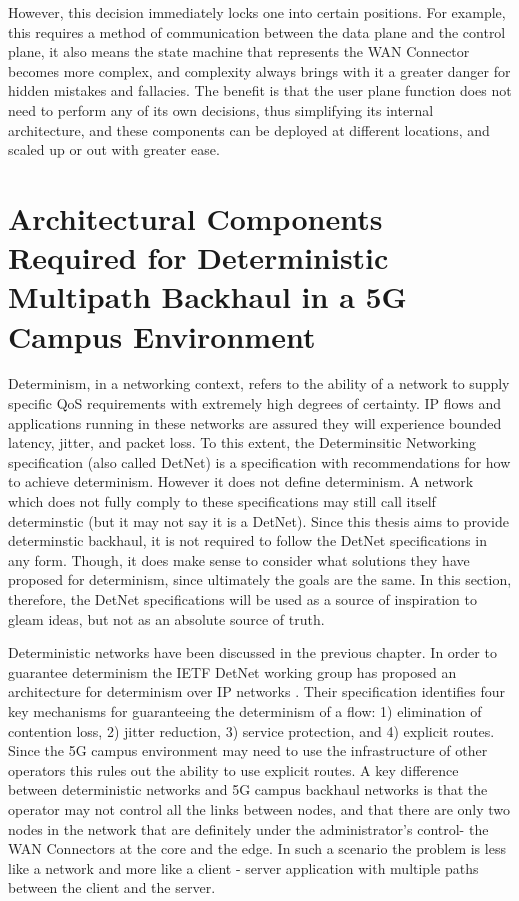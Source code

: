However, this decision immediately locks one into certain positions. For example, this requires a method of communication between the data plane and the control plane, it also means the state machine that represents the WAN Connector becomes more complex, and complexity always brings with it a greater danger for hidden mistakes and fallacies. The benefit is that the user plane function does not need to perform any of its own decisions, thus simplifying its internal architecture, and these components can be deployed at different locations, and scaled up or out with greater ease.

\section{Architectural Components Required for Deterministic Multipath Backhaul in a 5G Campus Environment}
\label{sec:approach:req}

Determinism, in a networking context, refers to the ability of a network to supply specific QoS requirements with extremely high degrees of certainty. IP flows and applications running in these networks are assured they will experience bounded latency, jitter, and packet loss. To this extent, the Determinsitic Networking specification (also called DetNet) is a specification with recommendations for how to achieve determinism. However it does not define determinism. A network which does not fully comply to these specifications may still call itself determinstic (but it may not say it is a DetNet). Since this thesis aims to provide determinstic backhaul, it is not required to follow the DetNet specifications in any form. Though, it does make sense to consider what solutions they have proposed for determinism, since ultimately the goals are the same. In this section, therefore, the DetNet specifications will be used as a source of inspiration to gleam ideas, but not as an absolute source of truth.

Deterministic networks have been discussed in the previous chapter. In order to guarantee determinism the IETF DetNet working group has proposed an architecture for determinism over IP networks \cite{finn2019deterministicArch}. Their specification identifies four key mechanisms for guaranteeing the determinism of a flow: 1) elimination of contention loss, 2) jitter reduction, 3) service protection, and 4) explicit routes. Since the 5G campus environment may need to use the infrastructure of other operators this rules out the ability to use explicit routes. A key difference between deterministic networks and 5G campus backhaul networks is that the operator may not control all the links between nodes, and that there are only two nodes in the network that are definitely under the administrator's control- the WAN Connectors at the core and the edge. In such a scenario the problem is less like a network and more like a client - server application with multiple paths between the client and the server.

